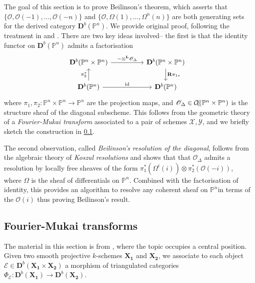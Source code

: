 \documentclass[a4paper]{article}
\theoremstyle{definition}
\theoremstyle{remark}
\newcommand{\deri}{\mathbf{D}}
\newcommand{\deritensor}{\ensuremath{\otimes^\mathbf{L}}}
\newcommand{\Pn}{\ensuremath{{\mathbb{P}^n}}}
\DeclareMathOperator{\coh}{\mathcal{C\kern -2pt o\kern -2pt h\kern -1pt}}
\begin{document}
The goal of this section is to prove Beilinson's theorem, which asserts that
\(\{\mathscr{O}, \mathscr{O}(-1),...,\mathscr{O}(-n)\}\) and \(\{\mathscr{O},
\Omega(1),...,\Omega^n(n)\}\) are both generating sets for the derived
category \(\deri^b(\Pn)\). We provide 
original proof, following the treatment in 
and .  There are two key ideas involved--
the first is that the identity functor on \(\deri^b(\Pn)\) admits a
factorisation
\[\begin{tikzcd}[column sep=huge]
    \deri^b( \Pn\times \Pn) \arrow[r, "-\deritensor \mathscr{O}_\Delta"] 
    & \deri^b(\Pn\times \Pn) \arrow[d, "\mathbf{R}\pi_{1\ast}"] \\
    \deri^b(\Pn) \arrow[u,"\pi_2^\ast"] \arrow[r,"\text{id}"] &
    \deri^b(\Pn)
\end{tikzcd}\]
where \(\pi_1,\pi_2:\Pn\times \Pn\rightarrow \Pn\) are the projection maps, and
\(\mathscr{O}_\Delta\in \coh(\Pn \times \Pn)\) is the structure sheaf of the
diagonal subscheme. This follows from the geometric theory of a
\textit{Fourier-Mukai transform} associated to a pair of schemes
\(\mathscr{X},\mathscr{Y}\), and we briefly sketch the construction in
\cref{fouriermukai}. 

The second observation, called \textit{Beilinson's resolution of the diagonal},
follows from the algebraic theory of \textit{Koszul resolutions} and shows that
that \(\mathscr{O}_\Delta\) admits a resolution by locally free sheaves of the
form \(\pi_1^\ast(\Omega^i(i))\otimes \pi_2^\ast (\mathscr{O}(-i))\), where
\(\Omega\) is the sheaf of differentials on \Pn. Combined with the factorisation
of identity, this provides an algorithm to resolve any coherent sheaf on \Pn in
terms of the \(\mathscr{O}(i)\) thus proving Beilinson's result.
 

\subsection{Fourier-Mukai transforms}\label{fouriermukai}

The material in this section is from ,
where the topic occupies a central position. Given two smooth projective
\(k\)-schemes \(\mathbf{X_1}\) and \(\mathbf{X_2}\), we associate to each object
\(\mathscr{E}\in \deri^b(\mathbf{X_1}\times \mathbf{X_2})\) a morphism of
triangulated categories
\(\Phi_\mathscr{E}: \deri^b(\mathbf{X_1})\rightarrow \deri^b(\mathbf{X_2})\).
\end{document}
